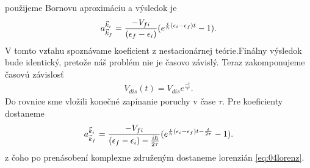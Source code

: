 použijeme Bornovu aproximáciu a výsledok je
\begin{align}
\label{eq:04coef_nonstac}
a^{\vec{k}_i}_{\vec{k}_f}=\frac{-V_{fi}}{(\epsilon_f-\epsilon_i)}(e^{\frac{i}{\hbar}(\epsilon_i-\epsilon_f)t}-1)\text{.}
\end{align}
V tomto vzťahu spoznávame koeficient z nestacionárnej teórie.Finálny výsledok bude identický, pretože náš problém nie je časovo závislý. Teraz zakomponujeme časovú  závislosť
\begin{align}
V_{dis}(t)=V_{dis}e^{\frac{-t}{\tau}} \text{.}
\end{align}
Do rovnice sme vložili konečné zapínanie poruchy v čase $\tau$. Pre koeficienty dostaneme
\begin{align}
\label{eq:04coef_nonstac2}
a^{\vec{k}_i}_{\vec{k}_f}=\frac{-V_{fi}}{(\epsilon_f-\epsilon_i)-\frac{i\hbar}{2\tau}}(e^{\frac{i}{\hbar}(\epsilon_i-\epsilon_f)t-\frac{t}{2\tau}}-1)\text{.}
\end{align}
z čoho po prenásobení komplexne združeným dostaneme lorenzián \eqref{eq:04lorenz}.

